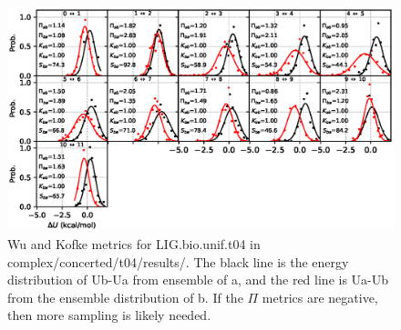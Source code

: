 \documentclass[journal=jctcce,manuscript=article,hyperref=false]{achemso}
\begin{document}
\begin{figure}
\includegraphics[clip,width=6in]{complex.concerted.t04.results..hist.eps}\vspace{-0.3cm}
                        \caption{Wu and Kofke metrics for LIG.bio.unif.t04 in complex/concerted/t04/results/. The black line is the energy distribution of Ub-Ua from ensemble of a, and the red line is Ua-Ub from the ensemble distribution of b. If the $\Pi$ metrics are negative, then more sampling is likely needed.}
\end{figure}
\end{document}
